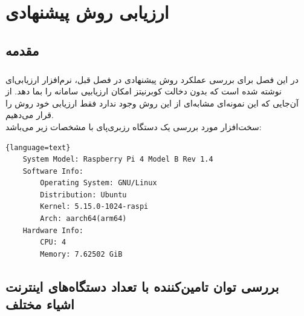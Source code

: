 
\chapter{ارزیابی روش پیشنهادی} \label{ch:eval}
\thispagestyle{empty}


\section{مقدمه}
\paragraph{}{
    در این فصل برای بررسی عملکرد روش پیشنهادی در فصل قبل، نرم‌افزار ارزیابی‌ای نوشته شده است که بدون دخالت کوبرنیتز امکان ارزیابیی سامانه را بما دهد.
    از آن‌جایی که این نمونه‌ای مشابه‌ای از این روش وجود ندارد فقط ارزیابی خود روش را قرار می‌دهیم.
    \\
    سخت‌افزار مورد بررسی یک دستگاه رزبری‌پای با مشخصات زیر می‌باشد:
    \begin{latin}
        \begin{lstlisting}{language=text}
    System Model: Raspberry Pi 4 Model B Rev 1.4
    Software Info:
        Operating System: GNU/Linux
        Distribution: Ubuntu
        Kernel: 5.15.0-1024-raspi
        Arch: aarch64(arm64)
    Hardware Info:
        CPU: 4
        Memory: 7.62502 GiB
        \end{lstlisting}
    \end{latin}
    \newpage
}

\section{
    بررسی توان تامین‌کننده با تعداد دستگاه‌های اینترنت اشیاء مختلف
}
\label{sec:different_devices}
